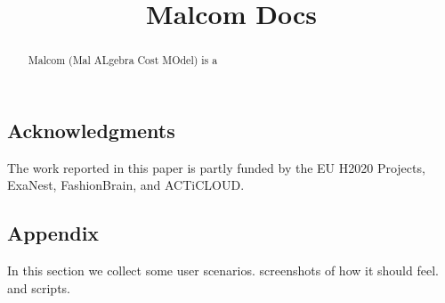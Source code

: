 \documentclass{article}
\begin{document}
\title{Malcom Docs}

\maketitle

\begin{abstract}
Malcom (Mal ALgebra Cost MOdel) is a
\end{abstract}






\subsection*{Acknowledgments}
The work reported in this paper is partly funded by the
EU H2020 Projects, ExaNest, FashionBrain, and ACTiCLOUD.
{\small


}
\subsection*{Appendix}
In this section we collect some user scenarios. screenshots of how it should feel.
and scripts.
\end{document}

